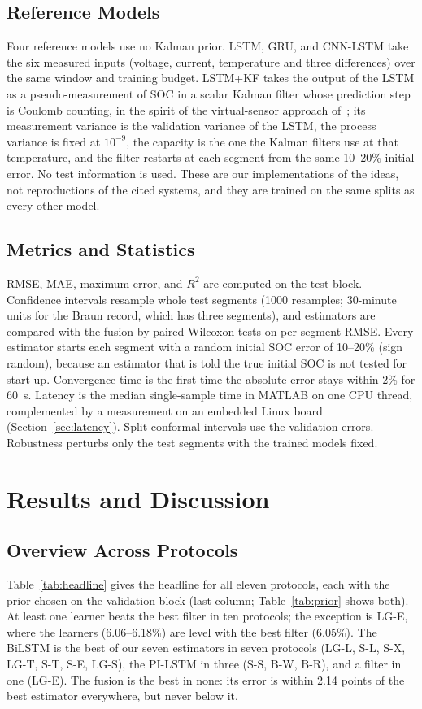 \documentclass[journal]{IEEEtran}
\begin{document}
\subsection{Reference Models}
Four reference models use no Kalman prior. LSTM, GRU, and CNN-LSTM take the six measured inputs (voltage, current, temperature and three differences) over the same window and training budget. LSTM+KF takes the output of the LSTM as a pseudo-measurement of SOC in a scalar Kalman filter whose prediction step is Coulomb counting, in the spirit of the virtual-sensor approach of~\cite{previtali2025iecon}; its measurement variance is the validation variance of the LSTM, the process variance is fixed at $10^{-9}$, the capacity is the one the Kalman filters use at that temperature, and the filter restarts at each segment from the same 10--20\% initial error. No test information is used. These are our implementations of the ideas, not reproductions of the cited systems, and they are trained on the same splits as every other model.

\subsection{Metrics and Statistics}
RMSE, MAE, maximum error, and $R^2$ are computed on the test block. Confidence intervals resample whole test segments (1000 resamples; 30-minute units for the Braun record, which has three segments), and estimators are compared with the fusion by paired Wilcoxon tests on per-segment RMSE. Every estimator starts each segment with a random initial SOC error of 10--20\% (sign random), because an estimator that is told the true initial SOC is not tested for start-up. Convergence time is the first time the absolute error stays within 2\% for 60~s. Latency is the median single-sample time in MATLAB on one CPU thread, complemented by a measurement on an embedded Linux board (Section~\ref{sec:latency}). Split-conformal intervals use the validation errors. Robustness perturbs only the test segments with the trained models fixed.

\section{Results and Discussion}\label{sec:results}
\subsection{Overview Across Protocols}
Table~\ref{tab:headline} gives the headline for all eleven protocols, each with the prior chosen on the validation block (last column; Table~\ref{tab:prior} shows both). At least one learner beats the best filter in ten protocols; the exception is LG-E, where the learners (6.06--6.18\%) are level with the best filter (6.05\%). The BiLSTM is the best of our seven estimators in seven protocols (LG-L, S-L, S-X, LG-T, S-T, S-E, LG-S), the PI-LSTM in three (S-S, B-W, B-R), and a filter in one (LG-E). The fusion is the best in none: its error is within 2.14 points of the best estimator everywhere, but never below it.
\end{document}
